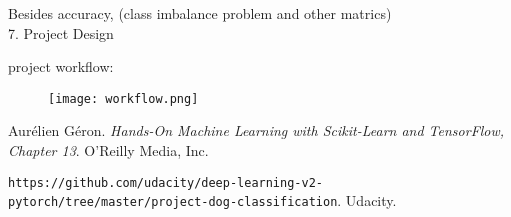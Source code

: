 \documentclass{article}
\begin{document}
Besides accuracy, (class imbalance problem and other matrics)
\\

7. Project Design

project workflow: 

\begin{figure}[hbt!]
\texttt{[image: workflow.png]}
\end{figure}

\begin{thebibliography}{9}
Aurélien Géron. 
\textit{Hands-On Machine Learning with Scikit-Learn and TensorFlow, Chapter 13}. 
O’Reilly Media, Inc.

\texttt{https://github.com/udacity/deep-learning-v2-pytorch/tree/master/project-dog-classification}. 
Udacity.

\end{thebibliography}
\end{document}
